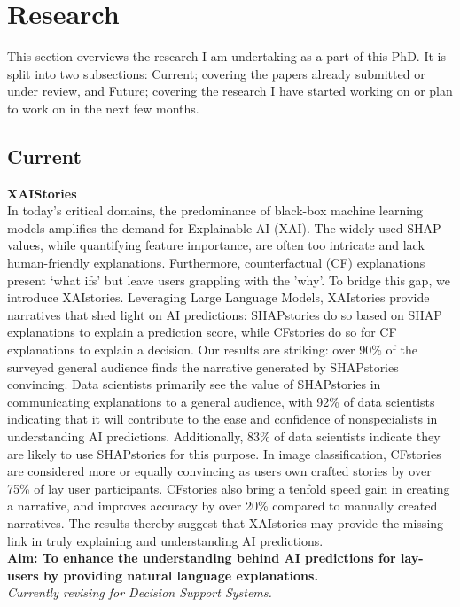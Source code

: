 \section{Research}

This section overviews the research I am undertaking as a part of this PhD. It is split into two subsections:
Current; covering the papers already submitted or under review, and Future; covering 
the research I have started working on or plan to work on in the next few months.

\subsection{Current}

\textbf{XAIStories}\\
In today's critical domains, the predominance of black-box machine learning models amplifies the demand for 
Explainable AI (XAI). The widely used SHAP values, while quantifying feature importance, are often too 
intricate and lack human-friendly explanations. Furthermore, counterfactual (CF) explanations present 
`what ifs' but leave users grappling with the 'why'. To bridge this gap, we introduce XAIstories. 
Leveraging Large Language Models, XAIstories provide narratives that shed light on AI predictions: 
SHAPstories do so based on SHAP explanations to explain a prediction score, while CFstories do so for CF 
explanations to explain a decision. Our results are striking: over 90\% of the surveyed general audience 
finds the narrative generated by SHAPstories convincing. Data scientists primarily see the value of SHAPstories 
in communicating explanations to a general audience, with 92\% of data scientists indicating that it will contribute 
to the ease and confidence of nonspecialists in understanding AI predictions. Additionally, 83\% of data 
scientists indicate they are likely to use SHAPstories for this purpose. In image classification, 
CFstories are considered more or equally convincing as users own crafted stories by over 75\% of lay 
user participants. CFstories also bring a tenfold speed gain in creating a narrative, and improves accuracy by 
over 20\% compared to manually created narratives. The results thereby suggest that XAIstories may provide the 
missing link in truly explaining and understanding AI predictions.\\
\textbf{Aim: To enhance the understanding behind AI predictions for lay-users by providing natural language
        explanations.}\\
\textit{Currently revising for Decision Support Systems.}

